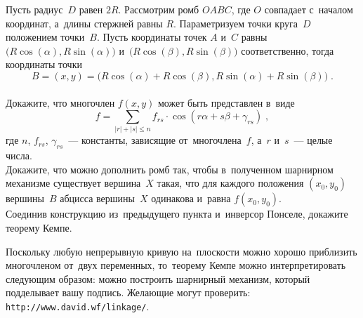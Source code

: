 \begin{problems}

\item
Пусть радиус~$D$ равен $2 R$.
Рассмотрим ромб $OABC$, где $O$ совпадает с~началом координат, а~длины стержней
равны $R$.
Параметризуем точки круга~$D$ положением точки~$B$.
Пусть координаты точек $A$ и~$C$ равны
\(
    \bigl( R \cos(\alpha), R \sin(\alpha) \bigr)
\)
и~\(
    \bigl( R \cos(\beta), R \sin(\beta) \bigr)
\)
соответственно, тогда координаты точки
\[
    B
=
    (x, y)
=
    \bigl(
        R \cos(\alpha) + R \cos(\beta),
        R \sin(\alpha) + R \sin(\beta)
    \bigr)
\; . \]
\\
\sp
Докажите, что многочлен $f(x, y)$ может быть представлен в~виде
\[
    f
=
    \sum\limits_{|r| + |s| \leq n}
        f_{rs} \cdot \cos(r \alpha + s \beta + \gamma_{rs})
\; , \]
где $n$, $f_{rs}$, $\gamma_{rs}$~--- константы, зависящие от~многочлена~$f$,
а~$r$ и~$s$~--- целые числа.
\\
\sp
Докажите, что можно дополнить ромб так, чтобы в~полученном шарнирном механизме
существует вершина~$X$ такая, что для каждого положения $(x_0, y_0)$
вершины~$B$ абцисса вершины~$X$ одинакова и~равна $f(x_0, y_0)$.
\\
\sp
Соединив конструкцию из~предыдущего пункта и~инверсор Понселе, докажите
теорему Кемпе.

\end{problems}

Поскольку любую непрерывную кривую на~плоскости можно хорошо приблизить
многочленом от~двух переменных, то~теорему Кемпе можно интерпретировать
следующим образом: можно построить шарнирный механизм, который подделывает
вашу подпись.
Желающие могут проверить:
\\
\begingroup\providecommand\url{\texttt}%
\url{http://www.david.wf/linkage/}.
\endgroup

